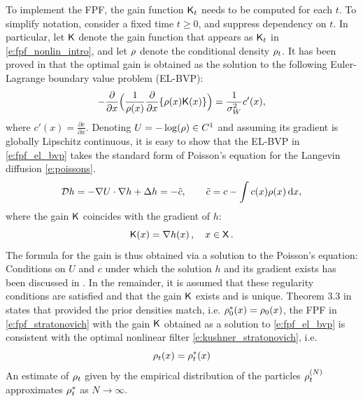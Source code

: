 To implement the FPF, the gain function $\text{\sf K}_t$ needs to be computed for each $t$. To simplify notation, consider a fixed time $t\ge 0$,  and suppress dependency on $t$.  In particular, let $\text{\sf K}$ denote the gain function that appears as  $ \text{\sf K}_t$  in \eqref{e:fpf_nonlin_intro},  and let $\rho$ denote the conditional density $\rho_t$. It has been proved in \cite{yanmehmey13} that the optimal gain is obtained as the solution to the following Euler-Lagrange boundary value problem (EL-BVP):
\begin{equation}
-\frac{\partial}{\partial x} \Bigl( \frac{1}{\pr(x)} \frac{\partial}{\partial x} \{\pr(x) \kFPF(x)\}\Bigr) = \frac{1}{\sigma_W^2} c'(x), 
\label{e:fpf_el_bvp}
\end{equation}
where $c'(x) = \frac{\partial c }{\partial x}$. Denoting $U=-\log(\rho)\in C^1$ and assuming its gradient is globally Lipschitz continuous, it is easy to show that the EL-BVP in \eqref{e:fpf_el_bvp} takes the standard form of Poisson's equation for the Langevin diffusion \eqref{e:poissons}.
\begin{equation}
{\cal D} h = -\nabla U \cdot \nabla h + \Delta h  = -\tilde c, \qquad \tilde c = c - \int c(x) \rho(x)\, \text{d} x, 
\end{equation}
where the gain $\text{\sf K}$ coincides with the gradient of $h$:
\begin{equation}
\kFPF (x) = \nabla h(x)\, ,  \quad x\in\state\, .
\label{e:fpf_k_gradient}
\end{equation}
The formula for the gain is thus obtained via a solution to the Poisson's equation:
Conditions on $U$ and $c$ under which the solution $h$ and its gradient exists has been discussed in . In the remainder, it is assumed that these regularity conditions are satisfied and that the gain $\text{\sf K}$ exists and is unique. Theorem 3.3 in \cite{yanmehmey13} states that provided the prior densities match, i.e. $\rho^*_0(x) = \rho_0(x)$, the FPF in \eqref{e:fpf_stratonovich} with the gain $\text{\sf K}$ obtained as a solution to \eqref{e:fpf_el_bvp} is consistent with the optimal nonlinear filter \eqref{e:kushner_stratonovich}, i.e.
\begin{equation}
\rho_t(x) = \rho^*_t(x) 
\end{equation}
An estimate of $\rho_t$ given by the empirical distribution of the particles $\rho^{(N)}_t$ approximates $\rho^*_t$ as $N \to \infty$. 
